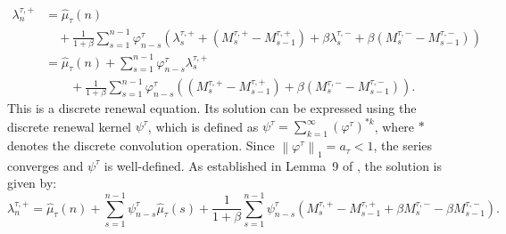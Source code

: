 \documentclass[letterpaper]{article}
\numberwithin{equation}{section}
\theoremstyle{definition}
\theoremstyle{remark}
\begin{document}
\begin{align*}
  \lambda_n^{\tau,+} 
  &= \hat{\mu}_{\tau}(n) 
  \\
  &\quad+ \frac{1}{1+\beta} \sum_{s=1}^{n-1} \varphi_{n-s}^{\tau} \left( \lambda_s^{\tau,+} + \left(M_s^{\tau,+} - M_{s-1}^{\tau,+}\right) + \beta \lambda_s^{\tau,-} + \beta\left(M_s^{\tau,-} - M_{s-1}^{\tau,-}\right) \right) \\
  &= \hat{\mu}_{\tau}(n) + \sum_{s=1}^{n-1} \varphi_{n-s}^{\tau} \lambda_s^{\tau,+} \\
  &\qquad+ \frac{1}{1+\beta} \sum_{s=1}^{n-1} \varphi_{n-s}^{\tau} \left( \left(M_s^{\tau,+} - M_{s-1}^{\tau,+}\right) + \beta\left(M_s^{\tau,-} - M_{s-1}^{\tau,-}\right) \right).
\end{align*}
This is a discrete renewal equation. Its solution can be expressed using the discrete renewal kernel $\psi^{\tau}$, which is defined as $\psi^{\tau} = \sum_{k=1}^\infty (\varphi^{\tau})^{*k}$, where $*$ denotes the discrete convolution operation. Since $\left\|\varphi^{\tau}\right\|_1 = a_\tau < 1$, the series converges and $\psi^\tau$ is well-defined. As established in Lemma~9 of \cite{wang2026scaling}, the solution is given by:
\begin{equation}\label{eq:lambda-decomp}
  \lambda_n^{\tau,+} = \hat{\mu}_\tau(n) + \sum_{s=1}^{n-1} \psi_{n-s}^\tau \hat{\mu}_\tau(s) + \frac{1}{1 + \beta} \sum_{s=1}^{n-1} \psi_{n-s}^\tau \left( M_s^{\tau,+} - M_{s-1}^{\tau,+} + \beta M_s^{\tau,-} - \beta M_{s-1}^{\tau,-} \right).
\end{equation}

\end{document}
